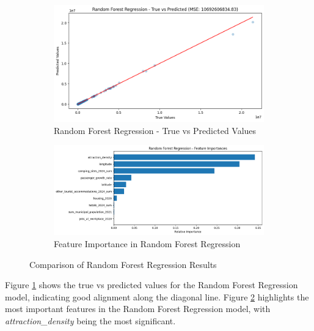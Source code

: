 \begin{figure}[H]
    \centering
    \begin{subfigure}[H]{0.45\textwidth}
        \centering
        \includegraphics[width=\textwidth]{assets/images/random_forest_regression.png}
        \caption{Random Forest Regression - True vs Predicted Values}
        \label{fig:random_forest_regression}
    \end{subfigure}
    \hfill
    \begin{subfigure}[H]{0.45\textwidth}
        \centering
        \includegraphics[width=\textwidth]{assets/images/feature_importance_random_forest.png}
        \caption{Feature Importance in Random Forest Regression}
        \label{fig:random_forest_feature_importance}
    \end{subfigure}
    \caption{Comparison of Random Forest Regression Results}
    \label{fig:random_forest_regression_comparison}
\end{figure}

Figure \ref{fig:random_forest_regression} shows the true vs predicted values for the Random Forest Regression model, indicating good alignment along the diagonal line. Figure \ref{fig:random_forest_feature_importance} highlights the most important features in the Random Forest Regression model, with \textit{attraction\_density} being the most significant.

